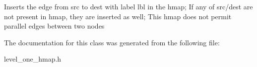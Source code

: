 Inserts the edge from src to dest with label lbl in the hmap; If any of src/dest are not present in hmap, they are inserted as well; This hmap does not permit parallel edges between two nodes 

The documentation for this class was generated from the following file:\begin{CompactItemize}
\item 
level\_\-one\_\-hmap.h\end{CompactItemize}
